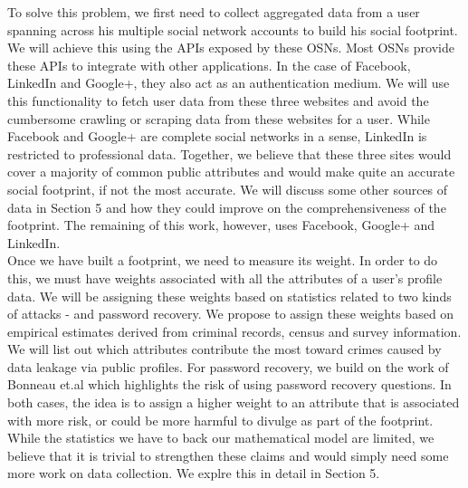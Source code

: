 \documentclass[10pt,conference]{IEEEtran}
\begin{document}
To solve this problem, we first need to collect aggregated data from a user spanning across his multiple social network accounts to build his social footprint. We will achieve this using the APIs exposed by these OSNs. Most OSNs provide these APIs to integrate with other applications. In the case of Facebook, LinkedIn and Google+, they also act as an authentication medium. We will use this functionality to fetch user data from these three websites and avoid the cumbersome crawling or scraping data from these websites for a user. While Facebook and Google+ are complete social networks in a sense, LinkedIn is restricted to professional data. Together, we believe that these three sites would cover a majority of common public attributes and would make quite an accurate social footprint, if not the most accurate. We will discuss some other sources of data in Section 5 and how they could improve on the comprehensiveness of the footprint. The remaining of this work, however, uses Facebook, Google+ and LinkedIn.\\

Once we have built a footprint, we need to measure its weight. In order to do this, we must have weights associated with all the attributes of a user's profile data. We will be assigning these weights based on statistics related to two kinds of attacks - and password recovery. We propose to assign these weights based on empirical estimates derived from criminal records, census and survey information. We will list out which attributes contribute the most toward crimes caused by data leakage via public profiles. For password recovery, we build on the work of Bonneau et.al \cite{google} which highlights the risk of using password recovery questions. In both cases, the idea is to assign a higher weight to an attribute that is associated with more risk, or could be more harmful to divulge as part of the footprint. While the statistics we have to back our mathematical model are limited, we believe that it is trivial to strengthen these claims and would simply need some more work on data collection. We explre this in detail in Section 5. \\
\end{document}
